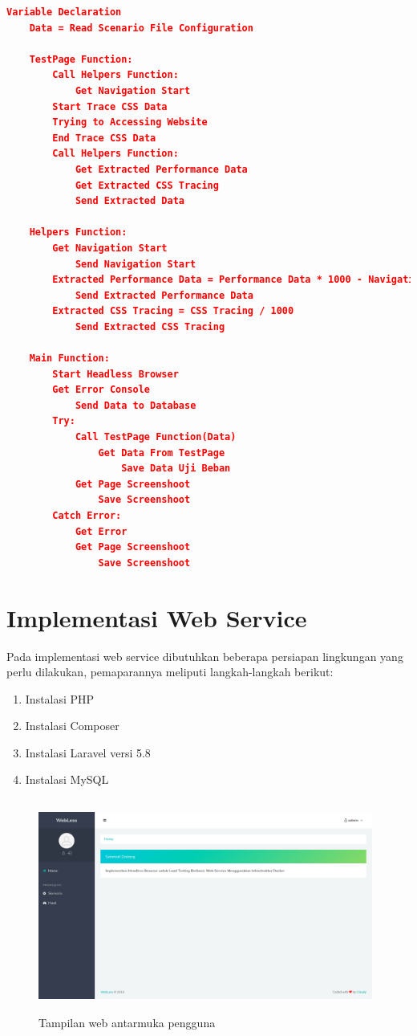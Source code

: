 	 	\begin{lstlisting}[frame=single,tabsize=2,breaklines,caption={Pseudocode Puppeteer },label=pseudocodepupp, captionpos=b, language=json,numbers=none]
 	Variable Declaration
 	Data = Read Scenario File Configuration
 	
 	TestPage Function:
 		Call Helpers Function:
 			Get Navigation Start
 		Start Trace CSS Data
 		Trying to Accessing Website
 		End Trace CSS Data
 		Call Helpers Function:
 			Get Extracted Performance Data
 			Get Extracted CSS Tracing
 			Send Extracted Data
 	
 	Helpers Function:
 		Get Navigation Start
 			Send Navigation Start
 		Extracted Performance Data = Performance Data * 1000 - Navigation Start
 			Send Extracted Performance Data
 		Extracted CSS Tracing = CSS Tracing / 1000
 			Send Extracted CSS Tracing 
 	
 	Main Function:
 		Start Headless Browser
 		Get Error Console
 			Send Data to Database
 		Try:
 			Call TestPage Function(Data)
 				Get Data From TestPage
 					Save Data Uji Beban
 			Get Page Screenshoot
 				Save Screenshoot
 		Catch Error:
 			Get Error
 			Get Page Screenshoot
 				Save Screenshoot
	 	\end{lstlisting}
	
	\section{Implementasi Web Service}
		Pada implementasi web service dibutuhkan beberapa persiapan lingkungan yang perlu dilakukan, pemaparannya meliputi langkah-langkah berikut:
		\begin{enumerate}
			\item Instalasi PHP
			\item Instalasi Composer
			\item Instalasi Laravel versi 5.8
			\item Instalasi MySQL
		\end{enumerate}
	
		\begin{figure}[h]
			\centering
			\includegraphics[width=11cm,height=7cm]{Images/C-4/gambarweb.png}
			\caption{Tampilan web antarmuka pengguna}
			\label{gambarweb}
		\end{figure}
		
